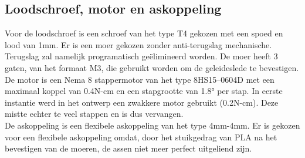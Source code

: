 \subsection{Loodschroef, motor en askoppeling}\label{sec: motor}
Voor de loodschroef is een schroef van het type T4 gekozen met een spoed en lood van 1mm. Er is een moer gekozen zonder anti-terugslag mechanische. Terugslag zal namelijk programatisch geëlimineerd worden. De moer heeft 3 gaten, van het formaat M3, die gebruikt worden om de geleideslede te bevestigen.
\\[12pt]De motor is een Nema 8 stappermotor van het type 8HS15--0604D met een maximaal koppel van 0.4N-cm en een stapgrootte van 1.8° per stap. In eerste instantie werd in het ontwerp een zwakkere motor gebruikt (0.2N-cm). Deze mistte echter te veel stappen en is dus vervangen.
\\[12pt]De askoppeling is een flexibele askoppeling van het type 4mm-4mm. Er is gekozen voor een flexibele askoppeling omdat, door het stuikgedrag van PLA na het bevestigen van de moeren, de assen niet meer perfect uitgeliend zijn.

